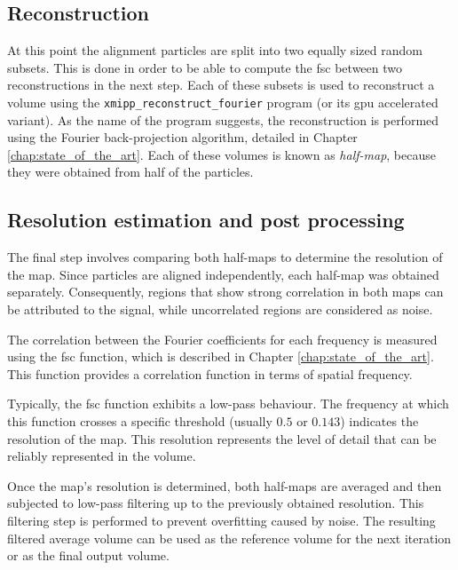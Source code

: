 \documentclass[../main.tex]{subfiles}
\begin{document}
\subsection{Reconstruction}
At this point the alignment particles are split into two equally sized random subsets. This is done in order to be able to compute the \gls{fsc} between two reconstructions in the next step. Each of these subsets is used to reconstruct a volume using the \texttt{xmipp\_reconstruct\_fourier} program (or its \gls{gpu} accelerated variant). As the name of the program suggests, the reconstruction is performed using the Fourier back-projection algorithm, detailed in Chapter \ref{chap:state_of_the_art}. Each of these volumes is known as \textit{half-map}, because they were obtained from half of the particles.

\subsection{Resolution estimation and post processing}
The final step involves comparing both half-maps to determine the resolution of the map. Since particles are aligned independently, each half-map was obtained separately. Consequently, regions that show strong correlation in both maps can be attributed to the signal, while uncorrelated regions are considered as noise.

The correlation between the Fourier coefficients for each frequency is measured using the \gls{fsc} function, which is described in Chapter \ref{chap:state_of_the_art}. This function provides a correlation function in terms of spatial frequency.

Typically, the \gls{fsc} function exhibits a low-pass behaviour. The frequency at which this function crosses a specific threshold (usually $0.5$ or $0.143$) indicates the resolution of the map. This resolution represents the level of detail that can be reliably represented in the volume.

Once the map's resolution is determined, both half-maps are averaged and then subjected to low-pass filtering up to the previously obtained resolution. This filtering step is performed to prevent overfitting caused by noise. The resulting filtered average volume can be used as the reference volume for the next iteration or as the final output volume.
\end{document}
